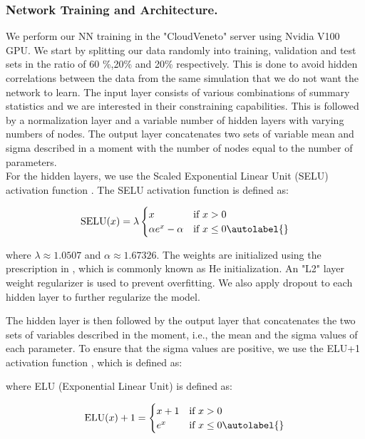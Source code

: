 \subsubsection{Network Training and Architecture.}
We perform our NN training in the "CloudVeneto" server using Nvidia V100 GPU.
We start by splitting our data randomly into training, validation and test sets in the ratio of 60 \%,20\% and 20\% respectively. This is done to avoid hidden correlations between the data from the same simulation that we do not want the network to learn. The input layer consists of various combinations of summary statistics and we are interested in their constraining capabilities. This is followed by a normalization layer and a variable number of hidden layers with varying numbers of nodes. The output layer concatenates two sets of variable mean and sigma described in a moment with the number of nodes equal to the number of parameters.\\
For the hidden layers, we use the Scaled Exponential Linear Unit (SELU) activation function \cite{klambauer2017selfnormalizingneuralnetworks}. The SELU activation function is defined as:

\begin{equation}
    \text{SELU}(x) = \lambda 
    \begin{cases} 
    x & \text{if } x > 0 \\
    \alpha e^x - \alpha & \text{if } x \leq 0 \autolabel{}
    \end{cases}
\end{equation}

where $\lambda \approx 1.0507$ and $\alpha \approx 1.67326$. The weights are initialized using the prescription in \cite{he2015deepresiduallearningimage}, which is commonly known as He initialization. An "L2" layer weight regularizer is used to prevent overfitting. We also apply dropout to each hidden layer \cite{JMLR:v15:srivastava14a} to further regularize the model. 

The hidden layer is then followed by the output layer that concatenates the two sets of variables described in the moment, i.e., the mean and the sigma values of each parameter. To ensure that the sigma values are positive, we use the ELU+1 activation function \cite{jung2024quijotepngoptimizingsummarystatistics}, which is defined as:

where ELU (Exponential Linear Unit) is defined as:

\begin{equation}
    \text{ELU}(x)+1 = 
    \begin{cases} 
    x+1 & \text{if } x > 0 \\
    e^x  & \text{if } x \leq 0 \autolabel{}
    \end{cases}
\end{equation}

